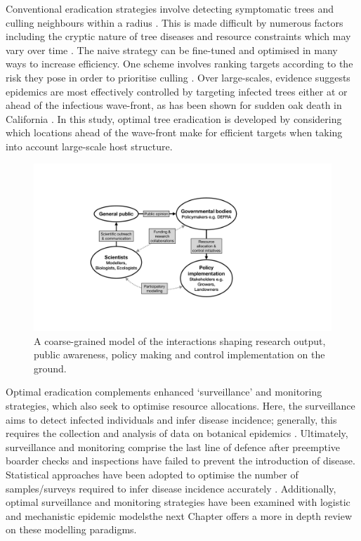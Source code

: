 Conventional eradication strategies involve detecting symptomatic trees and culling neighbours within a radius \cite{WEBIDEMICS}.
This is made difficult by numerous factors including the cryptic nature of tree diseases and resource constraints which may vary
over time \cite{control-theory, control-theory-application}. The naive strategy can be fine-tuned and optimised in many ways to increase
efficiency. One scheme involves ranking targets according to the risk they pose in order to prioritise culling \cite{risk-potential-control}.
Over large-scales, evidence suggests epidemics are most effectively controlled by targeting infected trees either at or ahead of
the infectious wave-front, as has been shown for sudden oak death in California \cite{large-scale-control}. In this study, optimal
tree eradication is developed by considering which locations ahead of the wave-front make for efficient targets when taking into account large-scale host structure.

\begin{figure}
    \centering
    \includegraphics[scale=0.35]{chapter1/figures/modelling-and-policy.pdf}
    \caption{A coarse-grained model of the interactions shaping research output, public awareness, policy making and 
    control implementation on the ground. }
    \label{fig:modelling-and-policies}
\end{figure}

Optimal eradication complements enhanced `surveillance' and monitoring strategies, 
which also seek to optimise resource allocations. Here, the surveillance aims to detect infected individuals and infer disease incidence;
generally, this requires the collection and analysis of data on botanical epidemics \cite{surveillance-review}.
Ultimately, surveillance and monitoring comprise the last line of defence after preemptive boarder 
checks and inspections have failed to prevent the introduction of disease. 
Statistical approaches have been adopted to optimise the number of samples/surveys required to infer disease incidence accurately \cite{yamamura2016sampling}.
Additionally, optimal surveillance and monitoring strategies have been examined with logistic \cite{parnell2012estimating} 
and mechanistic \cite{risk-potential-control} epidemic models\textemdash the next Chapter offers a more in depth review on these modelling paradigms.

